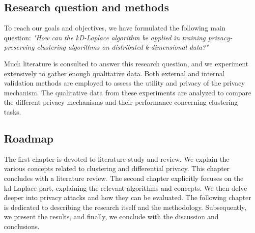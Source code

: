 

\subsection*{Research question and methods}
To reach our goals and objectives, we have formulated the following main question: \newline \newline
\textit{"How can the kD-Laplace algorithm be applied in training privacy-preserving clustering algorithms on distributed k-dimensional data?"} \newline

Much literature is consulted to answer this research question, and we experiment extensively to gather enough qualitative data.
Both external and internal validation methods are employed to assess the utility and privacy of the privacy mechanism.
The qualitative data from these experiments are analyzed to compare the different privacy mechanisms and their performance concerning clustering tasks.

\subsection*{Roadmap}
The first chapter is devoted to literature study and review.
We explain the various concepts related to clustering and differential privacy.
This chapter concludes with a literature review.
The second chapter explicitly focuses on the kd-Laplace part, explaining the relevant algorithms and concepts.
We then delve deeper into privacy attacks and how they can be evaluated. \newline
The following chapter is dedicated to describing the research itself and the methodology.
Subsequently, we present the results, and finally, we conclude with the discussion and conclusions.


